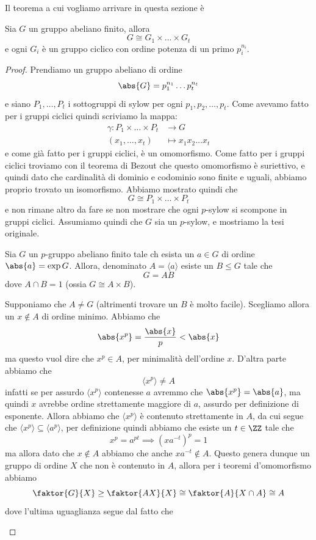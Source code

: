 \documentclass[11pt]{scrartcl}
\begin{document}
	Il teorema a cui vogliamo arrivare in questa sezione è
	\begin{theorem}
		Sia $G$ un gruppo abeliano finito, allora 
		$$G\cong G_1 \times \dots \times G_t$$
		e ogni $G_i$ è un gruppo ciclico con ordine potenza di un primo $p_i^{n_i}$.
	\end{theorem}
	\begin{proof}
		Prendiamo un gruppo abeliano di ordine 
		$$\abs{G}=p_1^{n_1}\dots p_t^{n_t}$$
		e siano $P_1,\dots, P_t$ i sottogruppi di sylow per ogni $p_1,p_2,\dots,p_t$. Come avevamo fatto per i gruppi ciclici quindi scriviamo la mappa:
		\begin{align*}
			\gamma: P_1\times \dots \times P_t & \to G \\
			\left(x_1,\dots,x_t\right) & \mapsto x_1x_2\dots x_t 
		\end{align*}
		e come già fatto per i gruppi ciclici, è un omomorfismo. Come fatto per i gruppi ciclici troviamo con il teorema di Bezout che questo omomorfismo è suriettivo, e quindi dato che cardinalità di dominio e codominio sono finite e uguali, abbiamo proprio trovato un isomorfismo. Abbiamo mostrato quindi che
		$$G\cong P_1\times \dots \times P_t$$
		e non rimane altro da fare se non mostrare che ogni $p$-sylow si scompone in gruppi ciclici. Assumiamo quindi che $G$ sia un $p$-sylow, e mostriamo la tesi originale. 
		\begin{claim}
			Sia $G$ un $p$-gruppo abeliano finito tale ch esista un $a\in G$ di ordine $\abs{a}=\exp G$. Allora, denominato $A=\langle a \rangle$ esiste un $B\le G$ tale che 
			$$G=AB$$
			dove $A\cap B=1$ (ossia $G\cong A\times B$).
		\end{claim}
		\begin{subproof}[Sottodimostrazione]
			Supponiamo che $A\ne G$ (altrimenti trovare un $B$ è molto facile). Scegliamo allora un $x\not\in A$ di ordine minimo. Abbiamo che
			$$\abs{x^p}=\frac{\abs{x}}{p}<\abs{x}$$
			ma questo vuol dire che $x^p\in A$, per minimalità dell'ordine $x$. D'altra parte abbiamo che
			$$\langle x^p\rangle \ne A$$
			infatti se per assurdo $\langle x^p\rangle$ contenesse $a$ avremmo che $\abs{x^p}=\abs{a}$, ma quindi $x$ avrebbe ordine strettamente maggiore di $a$, assurdo per definizione di esponente. Allora abbiamo che $\langle x^p\rangle$ è contenuto strettamente in $A$, da cui segue che $\langle x^p\rangle \subseteq \langle a^p\rangle$, per definizione quindi abbiamo che esiste un $t\in \ZZ$ tale che
			$$x^p = a^{pt} \implies \left(xa^{-t}\right)^p=1$$
			ma allora dato che $x\not\in A$ abbiamo che anche $xa^{-t}\not\in A$. Questo genera dunque un gruppo di ordine $X$ che non è contenuto in $A$, allora per i teoremi d'omomorfismo abbiamo
			$$\faktor{G}{X}\ge \faktor{AX}{X}\cong \faktor{A}{X\cap A}\cong A$$
			dove l'ultima uguaglianza segue dal fatto che 
		\end{subproof}
	\end{proof}
\end{document}
